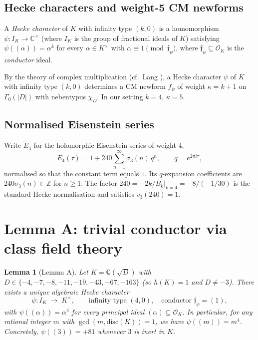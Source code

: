 \documentclass[12pt]{amsart}
\newtheorem{lemma}[theorem]{Lemma}
\theoremstyle{definition}
\newcommand{\Q}{\mathbb{Q}}
\newcommand{\Z}{\mathbb{Z}}
\newcommand{\C}{\mathbb{C}}
\newcommand{\OK}{\mathcal{O}_K}
\newcommand{\ff}{\mathfrak{f}}
\newcommand{\CiteNeeded}[1]{}
\begin{document}
\subsection{Hecke characters and weight-5 CM newforms}

A \emph{Hecke character} of $K$ with infinity type $(k, 0)$ is a
homomorphism $\psi: I_K \to \C^\times$ (where $I_K$ is the group of
fractional ideals of $K$) satisfying
$\psi((\alpha)) = \alpha^k$ for every $\alpha \in K^\times$ with
$\alpha \equiv 1 \pmod{\ff_\psi}$, where $\ff_\psi \subseteq \OK$ is
the \emph{conductor} ideal.

By the theory of complex multiplication (cf.\ Lang \CiteNeeded{Lang ANT, XII \S2}),
a Hecke character $\psi$ of $K$ with infinity type $(k, 0)$ determines a
CM newform $f_\psi$ of weight $\kappa = k+1$ on $\Gamma_0(|D|)$ with
nebentypus $\chi_D$.
In our setting $k = 4$, $\kappa = 5$.

\subsection{Normalised Eisenstein series}

Write $\widetilde{E}_4$ for the holomorphic Eisenstein series of weight $4$,
\[
  \widetilde{E}_4(\tau) = 1 + 240\sum_{n=1}^{\infty} \sigma_3(n)\,q^n,
  \qquad q = e^{2\pi i \tau},
\]
normalised so that the constant term equals $1$.
Its $q$-expansion coefficients are $240\sigma_3(n) \in \Z$ for $n \geq 1$.
The factor $240 = -2k/B_k|_{k=4} = -8/(-1/30)$ is the standard Hecke
normalisation and satisfies $v_3(240) = 1$.

\section{Lemma A: trivial conductor via class field theory}
\label{sec:lemmaA}

\begin{lemma}[Lemma A]
  \label{lem:A}
  Let $K = \Q(\sqrt{D})$ with $D \in \{-4, -7, -8, -11, -19, -43, -67,
  -163\}$ (so $h(K) = 1$ and $D \neq -3$).
  There exists a unique algebraic Hecke character
  \[
    \psi : I_K \;\longrightarrow\; K^\times,
    \qquad \text{infinity type }(4, 0),
    \quad \text{conductor } \ff_\psi = (1),
  \]
  with $\psi((\alpha)) = \alpha^4$ for every principal ideal $(\alpha)
  \subseteq \OK$.
  In particular, for any rational integer $m$ with
  $\gcd(m, \mathrm{disc}(K)) = 1$, we have $\psi((m)) = m^4$.
  Concretely, $\psi((3)) = +81$ whenever $3$ is inert in $K$.
\end{lemma}
\end{document}
